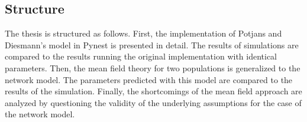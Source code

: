 \subsection{Structure}
The thesis is structured as follows. First, the implementation of Potjans and 
Diesmann's model in Pynest is presented in detail. The results of simulations 
are compared to the results running the original implementation with identical 
parameters. Then, the mean field theory for two populations is generalized 
to the network model. The parameters predicted with this model are compared 
to the results of the simulation. Finally, the shortcomings of the mean field 
approach are analyzed by questioning the validity of the underlying assumptions
for the case of the network model. 



